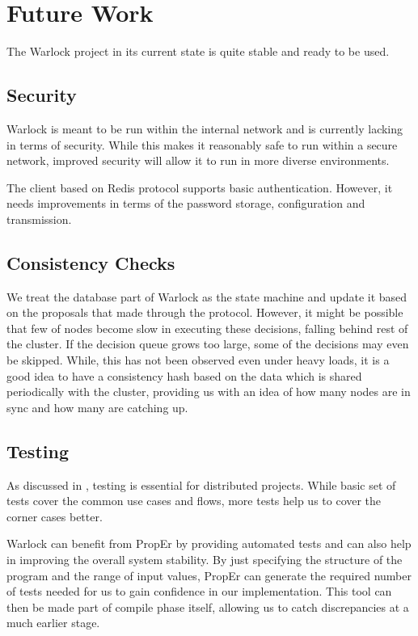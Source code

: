 \chapter{Future Work}
\label{chapter:future.work}

The Warlock project in its current state is quite stable and ready to be used.%


\section{Security}

Warlock is meant to be run within the internal network and is currently lacking
in terms of security. While this makes it reasonably safe to run within a secure
network, improved security will allow it to run in more diverse environments.

The client based on Redis protocol supports basic authentication. However, it
needs improvements in terms of the password storage, configuration and
transmission.

\section{Consistency Checks}

We treat the database part of Warlock as the state machine and update it based
on the proposals that made through the protocol. However, it might be possible
that few of nodes become slow in executing these decisions, falling behind
rest of the cluster. If the decision queue grows too large, some of the
decisions may even be skipped. While, this has not been observed even under
heavy loads, it is a good idea to have a consistency hash based on the data
which is shared periodically with the cluster, providing us with an idea of
how many nodes are in sync and how many are catching up.

\section{Testing}

As discussed in , testing is essential for distributed
projects. While basic set of tests cover the common use cases and flows, more
tests help us to cover the corner cases better.

Warlock can benefit from PropEr%
by providing automated tests and can also help in improving the overall
system stability. By just specifying the structure of the program and the range
of input values, PropEr can generate the required number of tests needed for
us to gain confidence in our implementation. This tool can then be made
part of compile phase itself, allowing us to catch discrepancies at a much
earlier stage.

